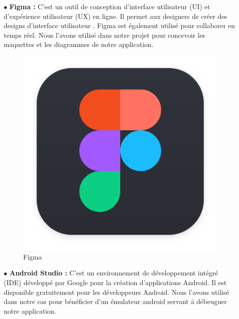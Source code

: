 \begin{itemize}
    \item[$\bullet$] \textbf{ Figma  :}
          C'est un outil de conception d’interface utilisateur (UI) et d’expérience utilisateur (UX) en ligne. Il permet aux designers de créer des designs d’interface utilisateur . Figma est également utilisé pour collaborer en temps réel. Nous l’avons utilisé dans notre projet pour concevoir les maquettes et les diagrammes de notre application.

          \begin{figure}[ht]
              \centering \includegraphics[scale=0.07]{chap1.images/FigmaLogo.png}
              \caption{Figma}
              \label{Figma}
          \end{figure}



    \item[$\bullet$] \textbf{ Android Studio :}
          C'est un environnement de développement intégré (IDE) développé par Google pour la création d’applications Android. Il est disponible gratuitement pour les développeurs Android. Nous l’avons utilisé dans notre cas pour bénéficier d’un émulateur android servant à débeuguer notre application.


\end{itemize}
